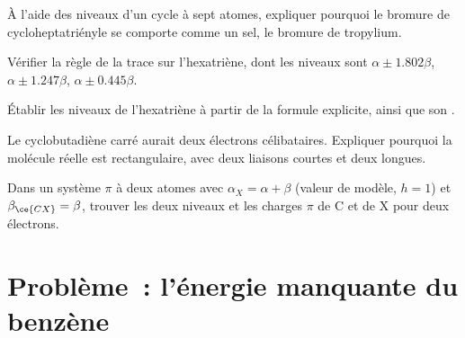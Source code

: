 \begin{exercise}[$\star\star$]\label{exo:b2:huckel:8}
À l'aide des niveaux d'un cycle à sept atomes, expliquer pourquoi le bromure de cycloheptatriényle
se comporte comme un sel, le bromure de tropylium.
\end{exercise}

\begin{exercise}[$\star\star$]\label{exo:b2:huckel:9}
Vérifier la règle de la trace sur l'hexatriène, dont les niveaux sont $\alpha \pm 1.802\beta$, $\alpha \pm
1.247\beta$, $\alpha \pm 0.445\beta$.
\end{exercise}

\begin{exercise}[$\star\star\star$]\label{exo:b2:huckel:10}
Établir les niveaux de l'hexatriène à partir de la formule explicite, ainsi que son .
\end{exercise}

\begin{exercise}[$\star\star\star$]\label{exo:b2:huckel:11}
Le cyclobutadiène carré aurait deux électrons célibataires. Expliquer pourquoi la molécule réelle
est rectangulaire, avec deux liaisons courtes et deux longues.
\end{exercise}

\begin{exercise}[$\star\star\star$]\label{exo:b2:huckel:12}
Dans un système $\pi$ à deux atomes  avec $\alpha_X = \alpha + \beta$ (valeur de modèle, $h = 1$) et
$\beta_{\ce{CX}} = \beta$, trouver les deux niveaux et les charges $\pi$ de C et de X pour deux
électrons.
\end{exercise}

\section{Problème~: l'énergie manquante du benzène}

